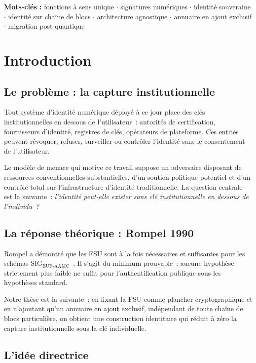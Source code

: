 \documentclass[11pt,a4paper]{article}
\begin{document}
\noindent\textbf{Mots-clés :} fonctions à sens unique $\cdot$ signatures
numériques $\cdot$ identité souveraine $\cdot$ identité sur chaîne de blocs
$\cdot$ architecture agnostique $\cdot$ annuaire en ajout exclusif $\cdot$
migration post-quantique

\section{Introduction}

\subsection{Le problème : la capture institutionnelle}

Tout système d'identité numérique déployé à ce jour place des clés
institutionnelles en dessous de l'utilisateur~: autorités de certification,
fournisseurs d'identité, registres de clés, opérateurs de plateforme.  Ces
entités peuvent révoquer, refuser, surveiller ou contrôler l'identité sans le
consentement de l'utilisateur.

Le modèle de menace qui motive ce travail suppose un adversaire disposant de
ressources conventionnelles substantielles, d'un soutien politique potentiel
et d'un contrôle total sur l'infrastructure d'identité traditionnelle.  La
question centrale est la suivante~: \emph{l'identité peut-elle exister sans
clé institutionnelle en dessous de l'individu~?}

\subsection{La réponse théorique : Rompel 1990}

Rompel a démontré que les FSU sont à la fois nécessaires et suffisantes pour
les schémas $\mathrm{SIG}_{\mathrm{EUF\text{-}AAMC}}$~\cite{rompel1990}.
Il s'agit du minimum prouvable~: aucune hypothèse strictement plus faible ne
suffit pour l'authentification publique sous les hypothèses standard.

Notre thèse est la suivante~: en fixant la FSU comme plancher cryptographique
et en n'ajoutant qu'un annuaire en ajout exclusif, indépendant de toute chaîne
de blocs particulière, on obtient une construction identitaire qui réduit à
zéro la capture institutionnelle sous la clé individuelle.

\subsection{L'idée directrice}
\end{document}
